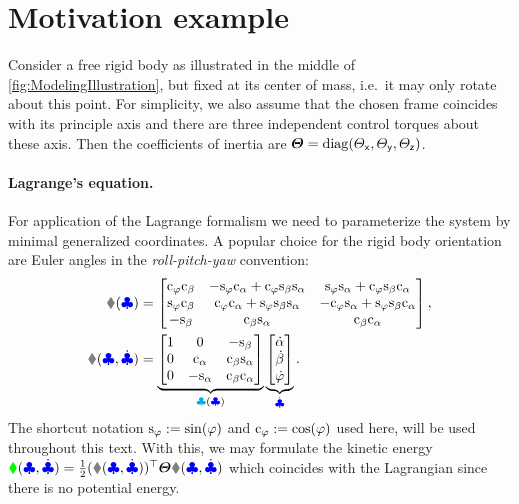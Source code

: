 \section{Motivation example}\label{sec:MotivationRigidBodyAttitude}
Consider a free rigid body as illustrated in the middle of \autoref{fig:ModelingIllustration}, but fixed at its center of mass, i.e.\ it may only rotate about this point.
For simplicity, we also assume that the chosen frame coincides with its principle axis and there are three independent control torques about these axis.
Then the coefficients of inertia are $\boldsymbol{\varTheta} = \operatorname{diag}(\varTheta_{\mathsf{x}},\varTheta_{\mathsf{y}},\varTheta_{\mathsf{z}})$.

\paragraph{Lagrange's equation.}
For application of the Lagrange formalism we need to parameterize the system by minimal generalized coordinates.
A popular choice for the rigid body orientation are Euler angles in the \textit{roll-pitch-yaw} convention:
\begin{subequations}\label{eq:EulerAngleParam}
\begin{align}
 \R(\genCoord) &=
 \begin{bmatrix}
  \cyaw \cpit & -\syaw \crol+\cyaw \spit \srol & \syaw \srol+\cyaw \spit \crol \\
  \syaw \cpit & \cyaw \crol+\syaw \spit \srol & -\cyaw \srol+\syaw \spit \crol \\
  -\spit & \cpit \srol & \cpit \crol  
 \end{bmatrix},
 \label{eq:EulerAngleParamR}
\\
 \w(\genCoord, \genCoordd) &=
 \underbrace{\begin{bmatrix}
  1 & 0 & -\spit \\
  0 & \crol & \cpit \srol \\
  0 & -\srol & \cpit \crol
 \end{bmatrix}}_{\kinBasisMat(\genCoord)}
 \underbrace{\begin{bmatrix} \rold \\ \pitd \\ \yawd \end{bmatrix}}_{\genCoordd}.
 \label{eq:EulerAngleParamW}
\end{align}
\end{subequations}
The shortcut notation $\mathrm{s}_{\varphi} := \sin(\varphi)$ and $\mathrm{c}_{\varphi} := \cos(\varphi)$ used here, will be used throughout this text.
With this, we may formulate the kinetic energy $\kineticEnergy(\genCoord, \genCoordd) = \tfrac{1}{2} (\w(\genCoord, \genCoordd))^\top \J \w(\genCoord, \genCoordd)$ which coincides with the Lagrangian since there is no potential energy.
